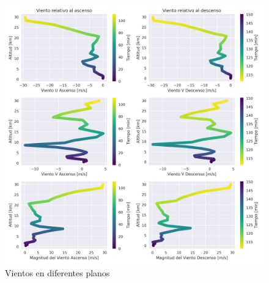 \begin{figure}[h]
    \centering
    \includegraphics[width=0.85\linewidth]{document/figures/03_vientos.png}
    \caption{Vientos en diferentes planos}
    \label{fig:vientos}
\end{figure}